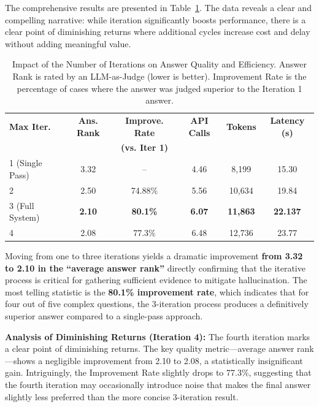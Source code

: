 \documentclass[11pt]{article}
\begin{document}
The comprehensive results are presented in Table~\ref{tab:iteration-ablation}. The data reveals a clear and compelling narrative: while iteration significantly boosts performance, there is a clear point of diminishing returns where additional cycles increase cost and delay without adding meaningful value.

\begin{table}[t]
\centering
\footnotesize
\begin{tabular}{lccccc}
\hline
\textbf{Max Iter.} & \textbf{Ans. Rank} & \textbf{Improve. Rate} & \textbf{API Calls} & \textbf{Tokens} & \textbf{Latency (s)} \\
& & \textbf{(vs. Iter 1)} & & & \\
\hline
1 (Single Pass) & 3.32 & -- & 4.46 & 8,199 & 15.30 \\
2 & 2.50 & 74.88\% & 5.56 & 10,634 & 19.84 \\
3 (Full System) & \textbf{2.10} & \textbf{80.1\%} & \textbf{6.07} & \textbf{11,863} & \textbf{22.137} \\
4 & 2.08 & 77.3\% & 6.48 & 12,736 & 23.77 \\
\hline
\end{tabular}
\caption{Impact of the Number of Iterations on Answer Quality and Efficiency. Answer Rank is rated by an LLM-as-Judge (lower is better). Improvement Rate is the percentage of cases where the answer was judged superior to the Iteration 1 answer.}
\label{tab:iteration-ablation}
\end{table}

Moving from one to three iterations yields a dramatic improvement \textbf{from 3.32 to 2.10 in the ``average answer rank''} directly confirming that the iterative process is critical for gathering sufficient evidence to mitigate hallucination. The most telling statistic is the \textbf{80.1\% improvement rate}, which indicates that for four out of five complex questions, the 3-iteration process produces a definitively superior answer compared to a single-pass approach.

\textbf{Analysis of Diminishing Returns (Iteration 4):} The fourth iteration marks a clear point of diminishing returns. The key quality metric---average answer rank---shows a negligible improvement from 2.10 to 2.08, a statistically insignificant gain. Intriguingly, the Improvement Rate slightly drops to 77.3\%, suggesting that the fourth iteration may occasionally introduce noise that makes the final answer slightly less preferred than the more concise 3-iteration result.
\end{document}
